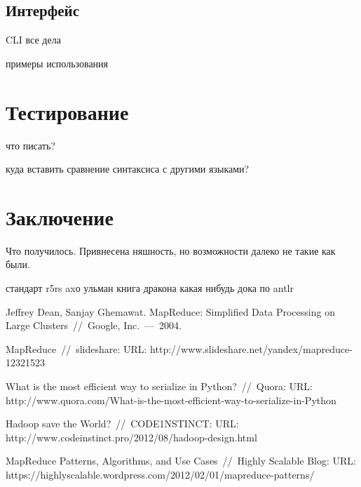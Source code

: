 \documentclass[12pt,a4paper,oneside]{extarticle}
\begin{document}
    \subsection{Интерфейс}
        CLI все дела

        примеры использования

        

\clearpage

\section{Тестирование}
    что писать?

    куда вставить сравнение синтаксиса с другими языками? 
\clearpage

\section{Заключение}
    Что получилось. Привнесена няшность, но возможности далеко не такие как были.
\clearpage


\begin{thebibliography}{0}
     стандарт r5rs
     axо ульман книга дракона
     какая нибудь дока по antlr

        Jeffrey Dean, Sanjay Ghemawat. MapReduce: Simplified Data Processing on Large Clusters~//~Google, Inc.~---~2004.

        MapReduce~//~slideshare: URL: \newline
        http://www.slideshare.net/yandex/mapreduce-12321523

        What is the most efficient way to serialize in Python?~//~Quora: URL:  \newline
        http://www.quora.com/What-is-the-most-efficient-way-to-serialize-in-Python

        Hadoop save the World?~//~CODE1NSTINCT: URL:  \newline
        http://www.codeinstinct.pro/2012/08/hadoop-design.html

        MapReduce Patterns, Algorithms, and Use Cases~//~Highly Scalable Blog: URL:  \newline
        https://highlyscalable.wordpress.com/2012/02/01/mapreduce-patterns/
        
\end{thebibliography}
\end{document}
